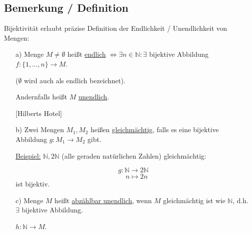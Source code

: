 \documentclass[a4paper, 12pt, twoside] {article}
\begin{document}
\subsection[Bemerkung / Definition (Endlichkeit, Mächtigkeit)]{Bemerkung / Definition} %

Bijektivität erlaubt präzise Definition der Endlichkeit / Unendlichkeit von Mengen:

\begin{itemize}
\item[a)] Menge $M \neq \emptyset$ heißt \underline{endlich} $\Leftrightarrow \exists n \in \mathbb{N} : \exists$ bijektive Abbildung $f \colon \{1,...,n\} \to M$.

($\emptyset$ wird auch als endlich bezeichnet).

Andernfalls heißt $M$ \underline{unendlich}.

[Hilberts Hotel]

\item[b)] Zwei Mengen $M_1, M_2$ heißen \underline{gleichmächtig}, falls es eine bijektive Abbildung $g \colon M_1 \rightarrow M_2$ gibt.

\underline{Beispiel:} $\mathbb{N}, 2\mathbb{N}$ (alle geraden natürlichen Zahlen) gleichmächtig:

$$g \colon \mathbb{N} \to 2\mathbb{N}$$
$$\quad n \mapsto 2n$$ \hfill ist bijektiv.




\item[c)] Menge $M$ heißt \underline{abzählbar unendlich}, wenn $M$ gleichmächtig ist wie $\mathbb{N}$, d.h. $\exists$ bijektive Abbildung.

$h \colon \mathbb{N} \rightarrow M$.

\end{itemize}
\end{document}
